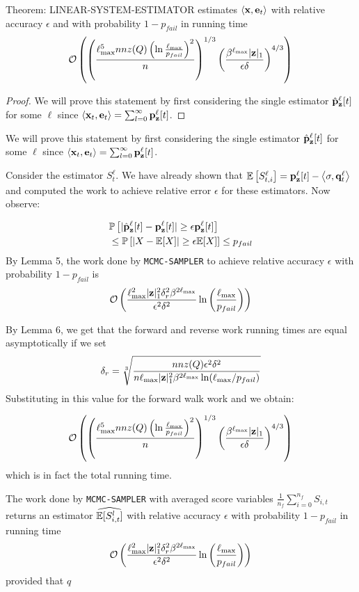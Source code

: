 
\begin{theorem}
Theorem: LINEAR-SYSTEM-ESTIMATOR estimates $\left< \mathbf{x}, \mathbf{e}_t \right>$ with relative accuracy $\epsilon$ and with probability $1-p_{fail}$ in running time 
$$ \mathcal{O}\left( \left(\frac{\ell_{\max}^5 nnz(Q)\left(\ln \frac{\ell_{\max}}{p_{fail}} \right)^2}{n} \right)^{1/3} \left( \frac{\beta^{\ell_{\max}} |\mathbf{z}|_1}{\epsilon \delta}\right)^{4/3} \right) $$

\end{theorem}
\begin{proof}
We will prove this statement by first considering the single estimator $\hat{\mathbf{p}}_\mathbf{z}^{\ell}[t]$ for some $\ell$ since $\left< \mathbf{x}_t, \mathbf{e}_t \right> = \sum_{l=0}^{\infty} {\mathbf{p}}_\mathbf{z}^{\ell}[t]$.

\end{proof}
We will prove this statement by first considering the single estimator $\hat{\mathbf{p}}_\mathbf{z}^{\ell}[t]$ for some $\ell$ since $\left< \mathbf{x}_t, \mathbf{e}_t \right> = \sum_{l=0}^{\infty} {\mathbf{p}}_\mathbf{z}^{\ell}[t]$.

Consider the estimator $S_{t}^{\ell}$. We have already shown that ${\mathbb{E}}\left[S_{t, i}^{\ell}\right] = {\mathbf{p}}_\mathbf{z}^{\ell}[t] - \left< \sigma, \mathbf{q}^{\ell}_t \right>$ and computed the work to achieve relative error $\epsilon$ for these estimators. Now observe:

\begin{align*}
&\mathbb{P}\left[ | \hat{\mathbf{p}}_\mathbf{z}^{\ell}[t] - {\mathbf{p}}_\mathbf{z}^{\ell}[t]| \geq  \epsilon {\mathbf{p}}_\mathbf{z}^{\ell}[t] \right] \\
&\leq \mathbb{P}\left[ |X -\mathbb{E}[X]| \geq \epsilon \mathbb{E}[X]\right] \leq p_{fail}
\end{align*}
By Lemma 5, the work done by \texttt{MCMC-SAMPLER} to achieve relative accuracy $\epsilon$ with probability $1-p_{fail}$ is 
$$ \mathcal{O}\left( \frac{\ell_{\max}^2 |\mathbf{z}|_1^2 \delta_r^2 \beta^{2\ell_{\max}}}{\epsilon^2\delta^2}\ln \left(\frac{\ell_{\max}}{p_{fail}}\right)\right) $$

By Lemma 6, we get that the forward and reverse work running times are equal asymptotically if we set 
$$\delta_r = \sqrt[3]{\frac{nnz(Q) \epsilon^2\delta^2}{n\ell_{\max} |\mathbf{z}|_1^2\beta^{2\ell_{\max}}\ln(\ell_{\max}/p_{fail}) } }$$
Substituting in this value for the forward walk work and we obtain:

$$ \mathcal{O}\left( \left(\frac{\ell_{\max}^5 nnz(Q)\left(\ln \frac{\ell_{\max}}{p_{fail}} \right)^2}{n} \right)^{1/3} \left( \frac{\beta^{\ell_{\max}} |\mathbf{z}|_1}{\epsilon \delta}\right)^{4/3} \right) $$
which is in fact the total running time.
\begin{lemma}
The work done by \texttt{MCMC-SAMPLER} with averaged score variables $\frac{1}{n_f}\sum_{i=0}^{n_f} S_{i, t}$ returns an estimator $\widehat{{\mathbb{E}}[S_{i, t}^l]}$ with relative accuracy $\epsilon$ with probability $1-p_{fail}$ in running time
$$\mathcal{O}\left( \frac{\ell_{\max}^2 |\mathbf{z}|_1^2 \delta_r^2 \beta^{2\ell_{\max}}}{\epsilon^2\delta^2}\ln \left(\frac{\ell_{\max}}{p_{fail}}\right)\right)$$
provided that $q$
\end{lemma}

